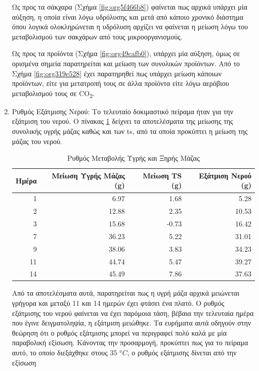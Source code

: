 \documentclass[11pt]{report}
\begin{document}
\begin{enumerate}
Ως προς τα σάκχαρα (Σχήμα \ref{fig:org5f466b8}) φαίνεται πως αρχικά υπάρχει μία αύξηση, η οποία είναι λόγω υδρόλυσης και μετά από κάποιο χρονικό διάστημα όπου λογικά ολοκληρώνεται η υδρόλυση αρχίζει να φαίνεται η μείωση λόγω του μεταβολισμού των σακχάρων από τους μικροοργανισμούς.

Ως προς τα προϊόντα (Σχήμα \ref{fig:org49cafb0}), υπάρχει μία αύξηση, όμως σε ορισμένα σημεία παρατηρείται και μείωση των συνολικών προϊόντων. Από το Σχήμα \ref{fig:org319e528} έχει παρατηρηθεί πως υπάρχει μείωση κάποιων προϊόντων, είτε για μετατροπή τους σε άλλα προϊόντα είτε λόγω αερόβιου μεταβολισμού τους σε CO\textsubscript{2}.

\item Ρυθμός Εξάτμισης Νερού:
\label{sec:org8cb05cb}
Το τελευταίο δοκιμαστικό πείραμα ήταν για την εξάτμιση του νερού. Ο πίνακας \ref{tab:orgd5ed8f3} δείχνει τα αποτελέσματα της μείωσης της συνολικής υγρής μάζας καθώς και των \acrshort{ts}, από τα οποία προκύπτει η μείωση της μάζας του νερού.

\begin{table}[htbp]
\caption{\label{tab:orgd5ed8f3}Ρυθμός Μεταβολής Υγρής και Ξηρής Μάζας}
\centering
\begin{tabular}{rrrr}
Ημέρα & Μείωση Υγρής Μάζας (g) & Μείωση TS (g) & Εξάτμιση Νερού (g)\\[0pt]
\hline
1 & 6.97 & 1.68 & 5.28\\[0pt]
2 & 12.88 & 2.35 & 10.53\\[0pt]
3 & 15.68 & -0.73 & 16.42\\[0pt]
7 & 36.23 & 5.22 & 31.01\\[0pt]
9 & 38.06 & 3.83 & 34.23\\[0pt]
11 & 44.74 & 5.47 & 39.27\\[0pt]
14 & 45.49 & 7.86 & 37.63\\[0pt]
\end{tabular}
\end{table}

Από τα αποτελέσματα αυτά, παρατηρείται πως η υγρή μάζα αρχικά μειώνεται γρήγορα και μεταξύ 11 και 14 ημερών έχει φτάσει ένα πλατό. Ο ρυθμός εξάτμισης του νερού φαίνεται να έχει παρόμοια τάση, βέβαια την τελευταία ημέρα που έγινε δειγματοληψία, η εξάτμιση μειώθηκε. Τα ευρήματα αυτά οδηγούν στην θεώρηση ότι ο ρυθμός εξάτμισης μπορεί να περιγραφεί πολύ καλά με μία παραβολική εξίσωση. Κάνοντας την προσαρμογή, προκύπτει πως για το πείραμα αυτό, το οποίο διεξάχθηκε στους 35 \(^oC\), ο ρυθμός εξάτμισης δίνεται από την εξίσωση


\end{enumerate}
\end{document}
